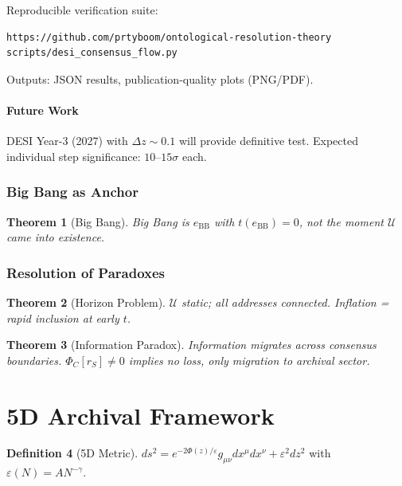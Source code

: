 \documentclass[12pt,a4paper]{article}
\numberwithin{equation}{section}
\theoremstyle{plain}
\newtheorem{theorem}{Theorem}[section]
\theoremstyle{definition}
\newtheorem{definition}[theorem]{Definition}
\theoremstyle{remark}
\newcommand{\Universe}{\ensuremath{\mathcal{U}}}
\newcommand{\PhiC}{\ensuremath{\Phi_C}}
\newcommand{\eps}{\ensuremath{\varepsilon}}
\begin{document}
Reproducible verification suite:
\begin{verbatim}
https://github.com/prtyboom/ontological-resolution-theory
scripts/desi_consensus_flow.py
\end{verbatim}

Outputs: JSON results, publication-quality plots (PNG/PDF).

\subsection{Future Work}

DESI Year-3 (2027) with $\Delta z \sim 0.1$ will provide definitive test. Expected individual step significance: $10$--$15\sigma$ each.

\section{Big Bang as Anchor}

\begin{theorem}[Big Bang]
Big Bang is $e_{\mathrm{BB}}$ with $t(e_{\mathrm{BB}}) = 0$, not the moment $\Universe$ came into existence.
\end{theorem}

\section{Resolution of Paradoxes}

\begin{theorem}[Horizon Problem]
$\Universe$ static; all addresses connected. Inflation = rapid inclusion at early $t$.
\end{theorem}

\begin{theorem}[Information Paradox]
Information migrates across consensus boundaries. $\PhiC[r_S] \neq 0$ implies no loss, only migration to archival sector.
\end{theorem}

\part{5D Archival Framework}

\begin{definition}[5D Metric]
$ds^2 = e^{-2\Phi(z)/\eps} g_{\mu\nu} dx^{\mu} dx^{\nu} + \eps^2 dz^2$ with $\eps(N) = A N^{-\gamma}$.
\end{definition}
\end{document}
